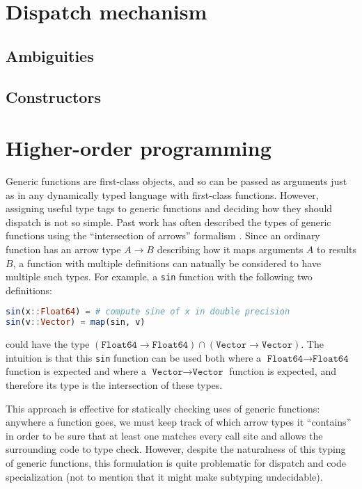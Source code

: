\section{Dispatch mechanism}

\subsection{Ambiguities}

\subsection{Constructors}


\section{Higher-order programming}

Generic functions are first-class objects, and so can be passed as arguments
just as in any dynamically typed language with first-class functions.
However, assigning useful type tags to generic functions and deciding how
they should dispatch is not so simple. Past work has often described the
types of generic functions using the ``intersection of arrows'' formalism
\cite{RonchiDellaRocca:1988:PTS:55079.55086} \cite{Dunfield:2012:EIU:2364527.2364534}
\cite{boundedquant} \cite{Castagna:1995:COF:203496.203510}. Since an ordinary
function has an arrow type $A\rightarrow B$ describing how it maps arguments
$A$ to results $B$, a function with multiple definitions can natually be
considered to have multiple such types. For example, a \texttt{sin} function
with the following two definitions:

\begin{singlespace}
\begin{lstlisting}[language=julia]
sin(x::Float64) = # compute sine of x in double precision
sin(v::Vector) = map(sin, v)
\end{lstlisting}
\end{singlespace}

\noindent
could have the type $(\texttt{Float64}\rightarrow\texttt{Float64})\cap(\texttt{Vector}\rightarrow\texttt{Vector})$. The intuition is that this \texttt{sin} function can be
used both where a $\texttt{Float64}\rightarrow\texttt{Float64}$ function
is expected and where a $\texttt{Vector}\rightarrow\texttt{Vector}$ function is expected,
and therefore its type is the intersection of these types.

This approach is effective for statically checking uses of generic
functions: anywhere a function goes, we must keep track of which arrow
types it ``contains'' in order to be sure that at least one matches
every call site and allows the surrounding code to type check.
However, despite the naturalness of this typing of generic functions,
this formulation is quite problematic for dispatch and code specialization
(not to mention that it might make subtyping undecidable).


